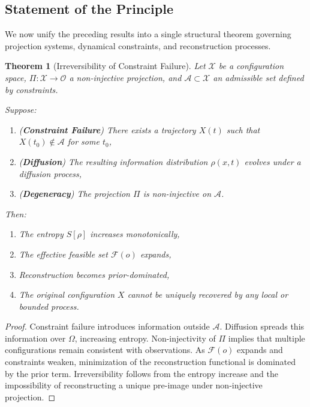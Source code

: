 \documentclass[12pt, oneside]{article}
\theoremstyle{plain}
\newtheorem{theorem}{Theorem}[section]
\theoremstyle{definition}
\theoremstyle{remark}
\begin{document}
\subsection{Statement of the Principle}

We now unify the preceding results into a single structural theorem governing projection systems, dynamical constraints, and reconstruction processes.

\begin{theorem}[Irreversibility of Constraint Failure]
Let $\mathcal{X}$ be a configuration space, $\Pi : \mathcal{X} \to \mathcal{O}$ a non-injective projection, and $\mathcal{A} \subset \mathcal{X}$ an admissible set defined by constraints.

Suppose:
\begin{enumerate}
\item (\textbf{Constraint Failure}) There exists a trajectory $X(t)$ such that $X(t_0) \notin \mathcal{A}$ for some $t_0$,
\item (\textbf{Diffusion}) The resulting information distribution $\rho(x,t)$ evolves under a diffusion process,
\item (\textbf{Degeneracy}) The projection $\Pi$ is non-injective on $\mathcal{A}$.
\end{enumerate}

Then:
\begin{enumerate}
\item The entropy $S[\rho]$ increases monotonically,
\item The effective feasible set $\mathcal{F}(o)$ expands,
\item Reconstruction becomes prior-dominated,
\item The original configuration $X$ cannot be uniquely recovered by any local or bounded process.
\end{enumerate}
\end{theorem}

\begin{proof}
Constraint failure introduces information outside $\mathcal{A}$. Diffusion spreads this information over $\Omega$, increasing entropy. Non-injectivity of $\Pi$ implies that multiple configurations remain consistent with observations. As $\mathcal{F}(o)$ expands and constraints weaken, minimization of the reconstruction functional is dominated by the prior term. Irreversibility follows from the entropy increase and the impossibility of reconstructing a unique pre-image under non-injective projection.
\end{proof}
\end{document}
